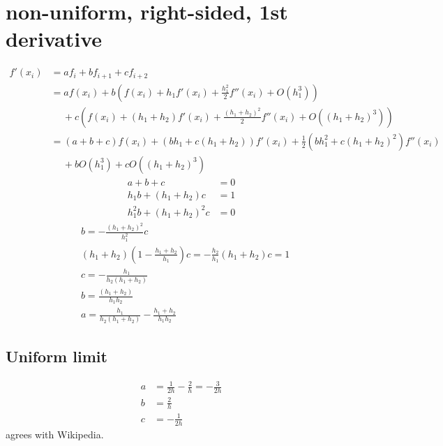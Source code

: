 \documentclass{article}
\begin{document}
\section{non-uniform, right-sided, 1st derivative}
\begin{align}
    f'\left( x_i \right) &= af_{i} + bf_{i+1} + cf_{i+2}
    \\
    &= af\left( x_i \right) + b\left( f\left( x_i \right) + h_{1}f'\left( x_i \right) + \frac{h_{1}^2}{2}f''\left( x_i \right) + O\left( h_{1}^3 \right)\right)
    \\ \nonumber
    &\quad\ + c\left( f\left( x_{i} \right) + \left( h_{1} + h_{2} \right)f'\left( x_i \right) + \frac{{\left( h_{1} + h_{2} \right)}^2}{2}f''\left( x_i \right) + O\left( {\left( h_{1} + h_{2} \right)}^3 \right)\right)
    \\
    &= \left( a + b + c \right)f\left( x_i \right)
    + \left( bh_{1} + c\left( h_1 + h_2 \right) \right)f'\left( x_i \right)
    + \frac{1}{2}\left( bh_{1}^{2} + c{\left(h_{1} + h_2\right)}^2 \right)f''\left( x_i \right)
    \\ \nonumber
    &\quad\ + bO\left( h_1^3 \right) + cO\left( {\left( h_1 + h_2 \right)}^3 \right)
    \label{}
\end{align}
\begin{align}
    a + b + c &= 0
    \\
    h_{1}b + \left( h_1 + h_{2} \right)c &= 1
    \\
    h_{1}^{2}b + {\left( h_1 + h_2 \right)}^2c &= 0
\end{align}
\begin{align}
    &b = -\frac{{\left(h_{1} + h_2\right)}^2}{h_{1}^2}c
    \\
    &\left( h_1 + h_2 \right)\left( 1 - \frac{h_1 + h_2}{h_1} \right)c = -\frac{h_2}{h_1}\left( h_1 + h_2 \right)c = 1
    \\
    &c = -\frac{h_1}{h_{2}\left( h_1 + h_2 \right)}
    \\
    &b = \frac{\left( h_1 + h_2 \right)}{h_1h_2}
    \\
    &a = \frac{h_1}{h_2\left( h_1+h_2 \right)} - \frac{h_1+h_2}{h_1h_2}
    \label{}
\end{align}
\subsection{Uniform limit}
\begin{align}
    a &= \frac{1}{2h} - \frac{2}{h} = -\frac{3}{2h}
    \\
    b &= \frac{2}{h}
    \\
    c &= -\frac{1}{2h}
    \label{}
\end{align}
agrees with Wikipedia.
\end{document}
